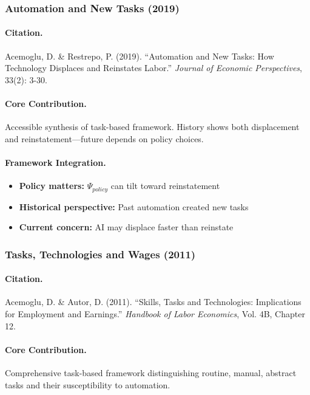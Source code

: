 \documentclass[12pt,a4paper]{article}
\begin{document}
\subsubsection{Automation and New Tasks (2019)}

\paragraph{Citation.}
Acemoglu, D. \& Restrepo, P. (2019).
``Automation and New Tasks: How Technology Displaces and Reinstates Labor.''
\emph{Journal of Economic Perspectives}, 33(2): 3-30.

\paragraph{Core Contribution.}
Accessible synthesis of task-based framework. History shows both
displacement and reinstatement---future depends on policy choices.

\paragraph{Framework Integration.}
\begin{itemize}
  \item \textbf{Policy matters:} $\Psi_{policy}$ can tilt toward reinstatement
  \item \textbf{Historical perspective:} Past automation created new tasks
  \item \textbf{Current concern:} AI may displace faster than reinstate
\end{itemize}

\subsubsection{Tasks, Technologies and Wages (2011)}

\paragraph{Citation.}
Acemoglu, D. \& Autor, D. (2011).
``Skills, Tasks and Technologies: Implications for Employment and Earnings.''
\emph{Handbook of Labor Economics}, Vol. 4B, Chapter 12.

\paragraph{Core Contribution.}
Comprehensive task-based framework distinguishing routine, manual,
abstract tasks and their susceptibility to automation.
\end{document}
